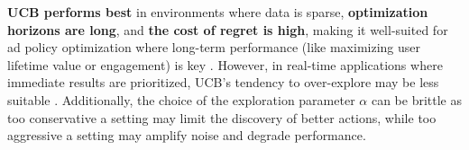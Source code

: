 \documentclass[final]{anthology-ch}         %
\begin{document}
\textbf{UCB performs best} in environments where data is sparse, \textbf{optimization horizons are long}, and \textbf{the cost of regret is high}, making it well-suited for ad policy optimization where long-term performance (like maximizing user lifetime value or engagement) is key \cite{bubeck2012regret, dulac2019challenges, Theocharous-2015}. However, in real-time applications where immediate results are prioritized, UCB’s tendency to over-explore may be less suitable \cite{mcmahan2013ad, Sutton1998, dulac2019challenges}. Additionally, the choice of the exploration parameter $\alpha$ can be brittle as too conservative a setting may limit the discovery of better actions, while too aggressive a setting may amplify noise and degrade performance.
    


\end{document}
